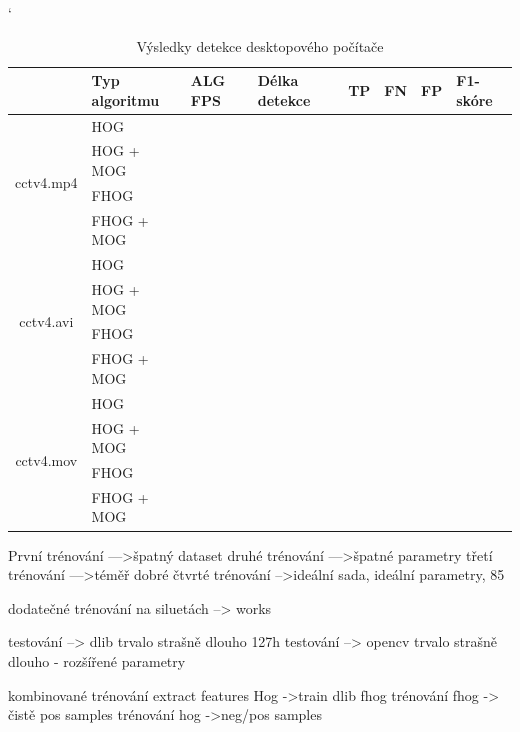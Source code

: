 \begin{table}[H]
\catcode`
\centering
\caption{Výsledky detekce desktopového počítače}
\label{resultTabDesktop}
\begin{tabular}{|c|l|l|l|l|l|l|l|}
\hline
                         & Typ algoritmu   & ALG FPS & Délka detekce & TP & FN & FP & F1-skóre \\ \hline
\multirow{4}{*}{cctv4.mp4} & HOG        &         &               &    &    &    &          \\ \cline{2-8} 
                         & HOG + MOG  &         &               &    &    &    &          \\ \cline{2-8} 
                         & FHOG       &         &               &    &    &    &          \\ \cline{2-8} 
                         & FHOG + MOG &         &               &    &    &    &          \\ \hline\hline 
\multirow{4}{*}{cctv4.avi} & HOG        &         &               &    &    &    &          \\ \cline{2-8} 
                         & HOG + MOG  &         &               &    &    &    &          \\ \cline{2-8} 
                         & FHOG       &         &               &    &    &    &          \\ \cline{2-8} 
                         & FHOG + MOG &         &               &    &    &    &          \\ \hline \hline
\multirow{4}{*}{cctv4.mov} & HOG        &         &               &    &    &    &          \\ \cline{2-8} 
                         & HOG + MOG  &         &               &    &    &    &          \\ \cline{2-8} 
                         & FHOG       &         &               &    &    &    &          \\ \cline{2-8} 
                         & FHOG + MOG &         &               &    &    &    &          \\ \hline
\end{tabular}
\end{table}
 První trénování --->špatný dataset
 druhé trénování --->špatné parametry
 třetí trénování --->téměř dobré
 čtvrté trénování -->ideální sada, ideální parametry, 85%
 
 dodatečné trénování na siluetách --> works


 testování --> dlib trvalo strašně dlouho 127h
 testování --> opencv trvalo strašně dlouho - rozšířené parametry


 kombinované trénování  extract features Hog  ->train dlib fhog
 trénování fhog -> čistě pos samples
 trénování hog ->neg/pos samples

